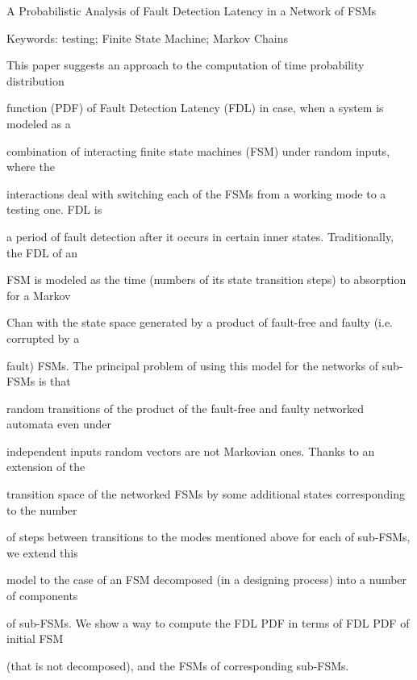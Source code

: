                 A Probabilistic Analysis of Fault Detection Latency in a Network of FSMs





Keywords: testing; Finite State Machine; Markov Chains 





    This paper suggests an approach to the computation of time probability distribution 


function (PDF) of Fault Detection Latency (FDL) in case, when a system is modeled as a 


combination of interacting finite state machines (FSM) under random inputs, where the 


interactions deal with switching each of the FSMs from a working mode to a testing one. FDL is 


a period of fault detection after it occurs in certain inner states. Traditionally, the FDL of an 


FSM is modeled as the time (numbers of its state transition steps) to absorption for a Markov 


Chan with the state space generated by a product of fault-free and faulty (i.e. corrupted by a 


fault) FSMs. The principal problem of using this model for the networks of sub-FSMs is that 


random transitions of the product of the fault-free and faulty networked automata even under 


independent inputs random vectors are not Markovian ones. Thanks to an extension of the 


transition space of the networked FSMs by some additional states corresponding to the number 


of steps between transitions to the modes mentioned above for each of sub-FSMs, we extend this 


model to the case of an FSM decomposed (in a designing process) into a number of components 


of sub-FSMs. We show a way to compute the FDL PDF in terms of FDL PDF of initial FSM 


(that is not decomposed), and the FSMs of corresponding sub-FSMs.   


